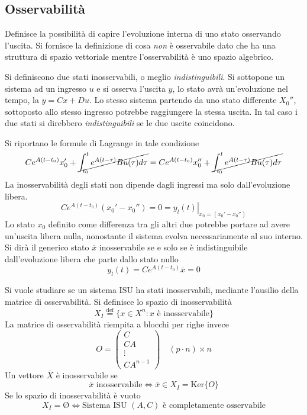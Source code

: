 \subsection{Osservabilità}
Definisce la possibilità di capire l'evoluzione interna di uno stato osservando
l'uscita.
Si fornisce la definizione di cosa \textit{non} è osservabile dato che ha una
struttura di spazio vettoriale mentre l'osservabilità è uno spazio
algebrico.

Si definiscono due stati inosservabili, o meglio \textit{indistinguibili}.
Si sottopone un sistema ad un ingresso $u$ e si osserva l'uscita $y$, lo stato
avrà un'evoluzione nel tempo, la $y=Cx+Du$.
Lo stesso sistema partendo da uno stato differente $X_0''$, sottoposto allo
stesso ingresso potrebbe raggiungere la stessa uscita. In tal caso i due stati
si direbbero \textit{indistinguibili} se le due uscite coincidono.

Si riportano le formule di Lagrange in tale condizione
$$
Ce^{A(t-t_0)}x_0' + \cancel{\int_{t_0}^t e^{A(t-\tau)}Bu(\tau)d\tau} =
Ce^{A(t-t_0)}x_0'' + \cancel{\int_{t_0}^t e^{A(t-\tau)}Bu(\tau)d\tau}
$$
La inosservabilità degli stati non dipende dagli ingressi ma solo
dall'evoluzione libera.
$$
Ce^{A(t-t_0)}(x_0'-x_0'') = 0 = \left.y_l(t)
\right|_{x_0=(x_0'-x_0'')}
$$
Lo stato $x_0$ definito come differenza tra gli altri due potrebbe portare ad
avere un'uscita libera nulla, nonostante il sistema evolva necessariamente al
suo interno. Si dirà il generico stato $\overline{x}$
inosservabile se e solo se è indistinguibile dall'evoluzione libera che parte
dallo stato nullo
$$
y_l(t) = Ce^{A(t-t_0)}\overline{x}=0
$$

Si vuole studiare se un sistema ISU ha stati inosservabili, mediante l'ausilio
della matrice di osservabilità.
Si definisce lo spazio di inosservabilità
$$
X_I \stackrel{\text{def}}{=}\{x\in X^n:x\text{ è inosservabile}\}
$$
La matrice di osservabilità riempita a blocchi per righe invece
$$
O = \begin{pmatrix}
C \\ CA \\ \vdots \\CA^{n-1}
\end{pmatrix} \quad (p\cdot n) \times n
$$
Un vettore $\overline{X}$ è inosservabile se
$$
\overline{x} \text{ inosservabile} \Leftrightarrow
\overline{x} \in X_I = \text{Ker}\{O\}
$$
Se lo spazio di inosservabilità è vuoto
$$
X_I = \text{\O{}} \Leftrightarrow \text{Sistema ISU $(A,C)$ è completamente
osservabile}
$$

\newpage
